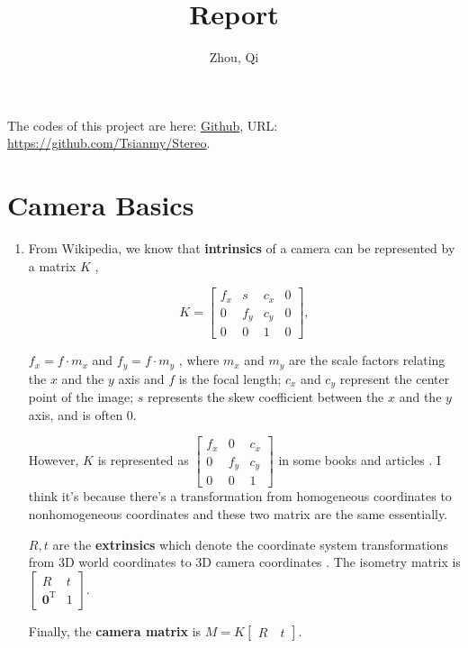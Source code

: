 \documentclass{article}
\title{Report}
\date{}
\author{Zhou, Qi}
\begin{document}
\maketitle

The codes of this project are here: \href{https://github.com/Tsianmy/Stereo}{Github}, URL: \url{https://github.com/Tsianmy/Stereo}.

\section*{Camera Basics}
\begin{enumerate}

\item From Wikipedia, we know that \textbf{intrinsics} of a camera can be represented by a matrix $K$ \cite{ref1}, 

$$
K =
\begin{bmatrix}
f_x & s & c_x & 0 \\
0 & f_y & c_y & 0 \\
0 & 0 & 1 & 0
\end{bmatrix},
$$

$f_x = f \cdot m_x$ and $f_y = f \cdot m_y$ , where $m_x$ and $m_y$ are the scale factors relating the $x$ and the $y$ axis and $f$ is the focal length; $c_x$ and $c_y$ represent the center point of the image; $s$ represents the skew coefficient between the $x$ and the $y$ axis, and is often $0$.

However, $K$ is represented as $\begin{bmatrix} f_x & 0 & c_x \\ 0 & f_y & c_y \\ 0 & 0 & 1 \end{bmatrix}$ in some books and articles \cite{ref2}\cite{ref3}. I think it's because there's a transformation from homogeneous coordinates to nonhomogeneous coordinates and these two matrix are the same essentially.

$R, t$ are the \textbf{extrinsics} which denote the coordinate system transformations from 3D world coordinates to 3D camera coordinates \cite{ref1}. The isometry matrix is $\begin{bmatrix} R & t \\ \boldsymbol 0^\mathrm T & 1 \end{bmatrix}$.

Finally, the \textbf{camera matrix} is $M = K \begin{bmatrix} R \quad t \end{bmatrix}$.


\end{enumerate}
\end{document}
